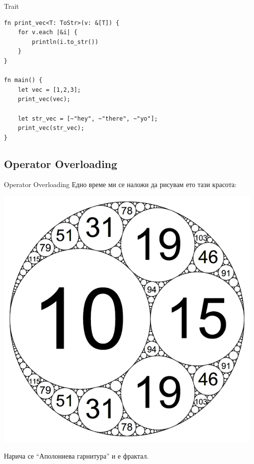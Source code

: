 \documentclass[xcolor=x11names,compress]{beamer}
\renewcommand{\(}{\begin{columns}}
\renewcommand{\)}{\end{columns}}
\newcommand{\<}[1]{\begin{column}{#1}}
\renewcommand{\>}{\end{column}}
\begin{document}
\begin{frame}[fragile]
  \begin{block}{Trait}
    \begin{lstlisting}
fn print_vec<T: ToStr>(v: &[T]) {
    for v.each |&i| {
        println(i.to_str())
    }
}

fn main() {
    let vec = [1,2,3];
    print_vec(vec);

    let str_vec = [~"hey", ~"there", ~"yo"];
    print_vec(str_vec);
}
    \end{lstlisting}
  \end{block}
\end{frame}


\subsection{Operator Overloading}

\begin{frame}{Operator Overloading}
  Едно време ми се наложи да рисувам ето тази красота:
  
  \pause
  \begin{center}
    \includegraphics[scale=0.2]{apollonian}
  \end{center}

  \pause
  Нарича се "`Аполониева гарнитура"' и е фрактал.
\end{frame}
\end{document}
